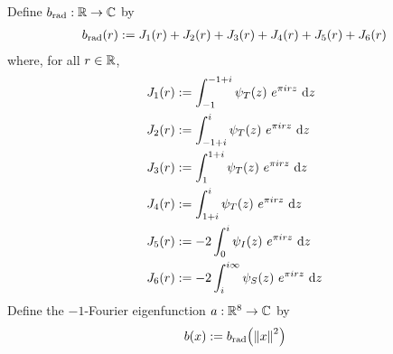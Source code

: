 \begin{boxdefinition}\label{Ch4:Def:b}
    Define $b_{\operatorname{rad}} : \mathbb{R} \to \mathbb{C}$ by
    \begin{align}
        b_{\operatorname{rad}}\!\left( r \right) := J_1(r) + J_2(r) + J_3(r) + J_4(r) + J_5(r) + J_6(r)
        \label{Ch4:Eq:b_rad_def}
    \end{align}
    where, for all $r \in \mathbb{R}$,
    \begin{align}
        J_1(r) &:= \int_{-1}^{-1 + i} \psi_T\of{z} \,
                                 e^{\pi i r z} \,
                                 \diff{z}
            \label{Ch4:Eq:J_1_def} \\
        J_2(r) &:= \int_{-1 + i}^{i} \psi_T\of{z} \,
                                 e^{\pi i r z} \,
                                 \diff{z}
            \label{Ch4:Eq:J_2_def} \\
        J_3(r) &:= \int_{1}^{1 + i} \psi_T\of{z} \,
                                e^{\pi i r z} \,
                                \diff{z}
            \label{Ch4:Eq:J_3_def} \\
        J_4(r) &:= \int_{1 + i}^{i} \psi_T\of{z} \,
                                e^{\pi i r z} \,
                                \diff{z}
            \label{Ch4:Eq:J_4_def} \\
        J_5(r) &:= -2 \int_{0}^{i} \psi_I\of{z} \,
                                e^{\pi i r z} \,
                                \diff{z}
            \label{Ch4:Eq:J_5_def} \\
        J_6(r) &:= -2 \int_{i}^{i \infty} \psi_S\of{z} \,
                                e^{\pi i r z} \,
                                \diff{z}
            \label{Ch4:Eq:J_6_def}
    \end{align}
    Define the $-1$-Fourier eigenfunction $a : \mathbb{R}^8 \to \mathbb{C}$ by
    \begin{align}
        b(x) := b_{\operatorname{rad}}\!\left( \left\lVert x \right\rVert^2 \right)
            \label{Ch4:Eq:b_def}
    \end{align}
\end{boxdefinition}

